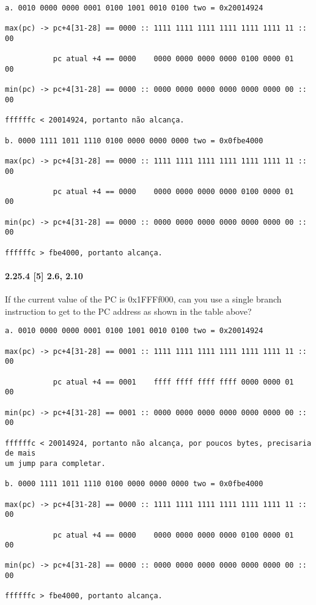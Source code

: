 \documentclass{article}
\begin{document}
\begin{verbatim}
a. 0010 0000 0000 0001 0100 1001 0010 0100 two = 0x20014924

max(pc) -> pc+4[31-28] == 0000 :: 1111 1111 1111 1111 1111 1111 11 :: 00

           pc atual +4 == 0000    0000 0000 0000 0000 0100 0000 01    00

min(pc) -> pc+4[31-28] == 0000 :: 0000 0000 0000 0000 0000 0000 00 :: 00

ffffffc < 20014924, portanto não alcança.

b. 0000 1111 1011 1110 0100 0000 0000 0000 two = 0x0fbe4000

max(pc) -> pc+4[31-28] == 0000 :: 1111 1111 1111 1111 1111 1111 11 :: 00

           pc atual +4 == 0000    0000 0000 0000 0000 0100 0000 01    00

min(pc) -> pc+4[31-28] == 0000 :: 0000 0000 0000 0000 0000 0000 00 :: 00

ffffffc > fbe4000, portanto alcança.
\end{verbatim}

\paragraph{2.25.4  [5] 2.6, 2.10} If the current value of the PC is 0x1FFFf000, 
can you use a single branch instruction to get to the PC address as shown in 
the table above?

\begin{verbatim}
a. 0010 0000 0000 0001 0100 1001 0010 0100 two = 0x20014924

max(pc) -> pc+4[31-28] == 0001 :: 1111 1111 1111 1111 1111 1111 11 :: 00

           pc atual +4 == 0001    ffff ffff ffff ffff 0000 0000 01    00

min(pc) -> pc+4[31-28] == 0001 :: 0000 0000 0000 0000 0000 0000 00 :: 00

ffffffc < 20014924, portanto não alcança, por poucos bytes, precisaria de mais 
um jump para completar.

b. 0000 1111 1011 1110 0100 0000 0000 0000 two = 0x0fbe4000

max(pc) -> pc+4[31-28] == 0000 :: 1111 1111 1111 1111 1111 1111 11 :: 00

           pc atual +4 == 0000    0000 0000 0000 0000 0100 0000 01    00

min(pc) -> pc+4[31-28] == 0000 :: 0000 0000 0000 0000 0000 0000 00 :: 00

ffffffc > fbe4000, portanto alcança.
\end{verbatim}
\end{document}
